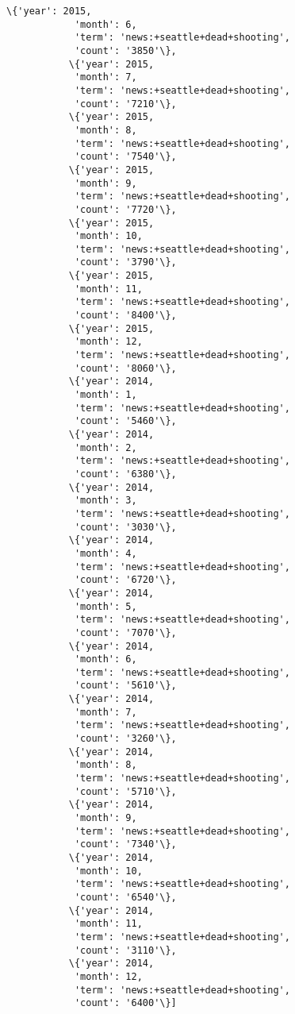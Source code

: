 \documentclass[11pt]{article}
\begin{document}
\begin{Verbatim}[commandchars=\\\{\}]
           \{'year': 2015,
            'month': 6,
            'term': 'news:+seattle+dead+shooting',
            'count': '3850'\},
           \{'year': 2015,
            'month': 7,
            'term': 'news:+seattle+dead+shooting',
            'count': '7210'\},
           \{'year': 2015,
            'month': 8,
            'term': 'news:+seattle+dead+shooting',
            'count': '7540'\},
           \{'year': 2015,
            'month': 9,
            'term': 'news:+seattle+dead+shooting',
            'count': '7720'\},
           \{'year': 2015,
            'month': 10,
            'term': 'news:+seattle+dead+shooting',
            'count': '3790'\},
           \{'year': 2015,
            'month': 11,
            'term': 'news:+seattle+dead+shooting',
            'count': '8400'\},
           \{'year': 2015,
            'month': 12,
            'term': 'news:+seattle+dead+shooting',
            'count': '8060'\},
           \{'year': 2014,
            'month': 1,
            'term': 'news:+seattle+dead+shooting',
            'count': '5460'\},
           \{'year': 2014,
            'month': 2,
            'term': 'news:+seattle+dead+shooting',
            'count': '6380'\},
           \{'year': 2014,
            'month': 3,
            'term': 'news:+seattle+dead+shooting',
            'count': '3030'\},
           \{'year': 2014,
            'month': 4,
            'term': 'news:+seattle+dead+shooting',
            'count': '6720'\},
           \{'year': 2014,
            'month': 5,
            'term': 'news:+seattle+dead+shooting',
            'count': '7070'\},
           \{'year': 2014,
            'month': 6,
            'term': 'news:+seattle+dead+shooting',
            'count': '5610'\},
           \{'year': 2014,
            'month': 7,
            'term': 'news:+seattle+dead+shooting',
            'count': '3260'\},
           \{'year': 2014,
            'month': 8,
            'term': 'news:+seattle+dead+shooting',
            'count': '5710'\},
           \{'year': 2014,
            'month': 9,
            'term': 'news:+seattle+dead+shooting',
            'count': '7340'\},
           \{'year': 2014,
            'month': 10,
            'term': 'news:+seattle+dead+shooting',
            'count': '6540'\},
           \{'year': 2014,
            'month': 11,
            'term': 'news:+seattle+dead+shooting',
            'count': '3110'\},
           \{'year': 2014,
            'month': 12,
            'term': 'news:+seattle+dead+shooting',
            'count': '6400'\}]
\end{Verbatim}
            
\end{document}
